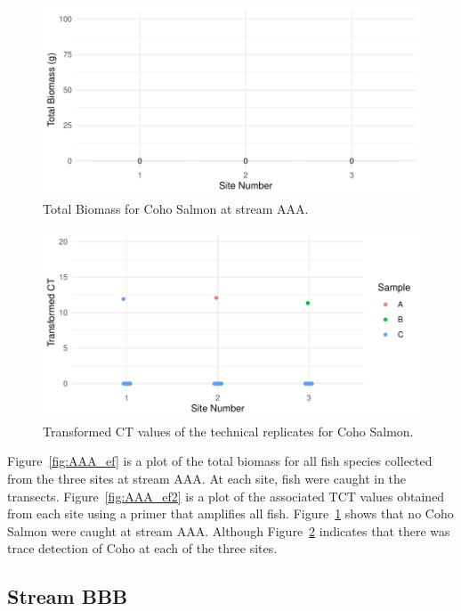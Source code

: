 \begin{figure}[H]
\centering
\includegraphics{Chapter5Images/AAA_Co_new.pdf}
\caption{  Total Biomass for Coho Salmon at stream AAA.}
\label{fig:AAA_coho}
\end{figure}



\begin{figure}[H]
\centering
\includegraphics{Chapter5Images/AAA_co_tct.pdf}
\caption{  Transformed CT values of the technical replicates for Coho Salmon.}
\label{fig:AAA_co}
\end{figure}


Figure~\ref{fig:AAA_ef} is a plot of the total biomass for all fish species collected from the three sites at stream AAA. At each site, fish were caught in the transects. Figure~\ref{fig:AAA_ef2} is a plot of the associated TCT values obtained from each site using a primer that amplifies all fish.
\vspace{5mm}
Figure~\ref{fig:AAA_coho} shows that no Coho Salmon were caught at stream AAA. Although Figure~\ref{fig:AAA_co} indicates that there was trace detection of Coho at each of the three sites.


\newpage

\subsection{Stream BBB}



